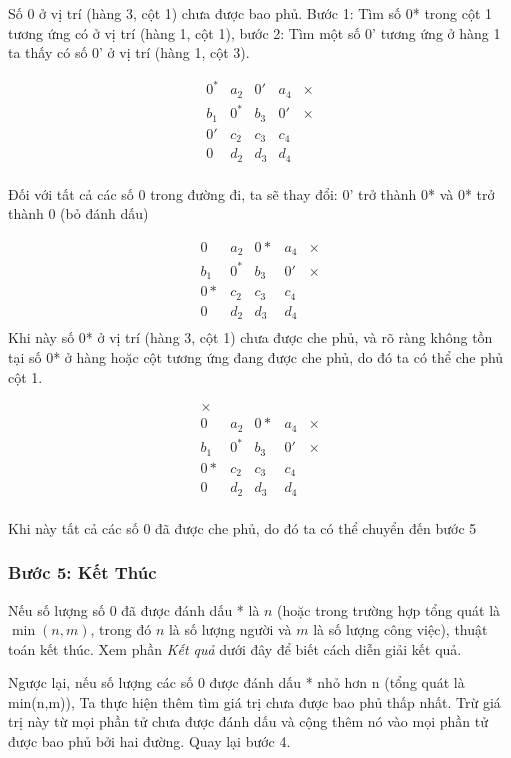 Số 0 ở vị trí (hàng 3, cột 1) chưa được bao phủ. Bước 1: Tìm số 0* trong cột 1 tương ứng có ở vị trí (hàng 1, cột 1),
bước 2: Tìm một số 0' tương ứng ở hàng 1 ta thấy có số 0' ở vị trí (hàng 1, cột 3).

\[
\begin{array}{ccccc}
0^* & a_2 & 0' & a_4 & \times \\
b_1 & 0^* & b_3 & 0' & \times \\
0' & c_2 & c_3 & c_4 & \\
0 & d_2 & d_3 & d_4 & \\
\end{array}
\]

Đối với tất cả các số 0 trong đường đi, ta sẽ thay đổi: 0' trở thành 0* và 0* trở thành 0 (bỏ đánh dấu)

\[
\begin{array}{ccccc}
0 & a_2 & 0* & a_4 & \times \\
b_1 & 0^* & b_3 & 0' & \times \\
0* & c_2 & c_3 & c_4 & \\
0 & d_2 & d_3 & d_4 & \\
\end{array}
\]
Khi này số 0* ở vị trí (hàng 3, cột 1) chưa được che phủ, và rõ ràng không tồn tại số 0* ở hàng hoặc cột tương ứng đang được che phủ, do đó ta có thể che phủ cột 1.

\[
\begin{array}{ccccc}
\times    & & & &   \\
0 & a_2 & 0* & a_4 & \times \\
b_1 & 0^* & b_3 & 0' & \times \\
0* & c_2 & c_3 & c_4 & \\
0 & d_2 & d_3 & d_4 & \\
\end{array}
\]

Khi này tất cả các số 0 đã được che phủ, do đó ta có thể chuyển đến bước 5

\subsubsection*{Bước 5: Kết Thúc}

Nếu số lượng số 0 đã được đánh dấu * là $n$ (hoặc trong trường hợp tổng quát là ${\displaystyle \min(n,m)}$, trong đó $n$ là số lượng người và $m$ là số lượng công việc), thuật toán kết thúc. Xem phần \textit{Kết quả} dưới đây để biết cách diễn giải kết quả.

Ngược lại, nếu số lượng các số 0 được đánh dấu * nhỏ hơn n (tổng quát là min(n,m)),
Ta thực hiện thêm tìm giá trị chưa được bao phủ thấp nhất. Trừ giá trị này từ mọi phần tử chưa được đánh dấu và cộng thêm nó vào mọi phần tử được bao phủ bởi hai đường. Quay lại bước 4.

